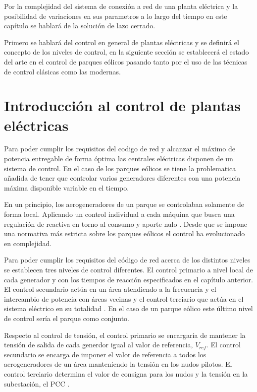 \documentclass{book}
\begin{document}
Por la complejidad del sistema de conexi\'on a red de una planta el\'ectrica y la posibilidad de variaciones en sus parametros a lo largo del tiempo en este cap\'itulo se hablar\'a de la soluci\'on de lazo cerrado. \par

 Primero se hablar\'a del control en general de plantas el\'ectricas y se definir\'a el concepto de los niveles de control, en la siguiente secci\'on se establecer\'a el estado del arte en el control de parques e\'olicos pasando tanto por el uso de las t\'ecnicas de control cl\'asicas como las modernas. \par 

	\section{Introducci\'on al control de plantas el\'ectricas}

Para poder cumplir los requisitos del codigo de red y alcanzar el m\'aximo de potencia entregable de forma \'optima las centrales el\'ectricas disponen de un sistema de control. En el caso de los parques e\'olicos se tiene la problematica añadida de tener que controlar varios generadores diferentes con una potencia m\'axima disponible variable en el tiempo. \par

En un principio, los aerogeneradores de un parque se controlaban solamente de forma local. Aplicando un control individual a cada m\'aquina que busca una regulaci\'on de reactiva en torno al consumo y aporte nulo \cite{PI_QV}. Desde que se impone una normativa m\'as estricta sobre los parques e\'olicos el control ha evolucionado en complejidad. \par

Para poder cumplir los requisitos del c\'odigo de red acerca de los distintos niveles se establecen tres niveles de control diferentes. El control primario a nivel local de cada generador y con los tiempos de reacci\'on especificados en el cap\'itulo anterior. El control secundario act\'ua en un \'area atendiendo a la frecuencia y el intercambio de potencia con \'areas vecinas y el control terciario que act\'ua en el sistema el\'ectrico en su totalidad \cite{NivelesDeControl}. En el caso de un parque e\'olico este \'ultimo nivel de control ser\'ia el parque como conjunto. \par

Respecto al control de tensi\'on, el control primario se encargar\'ia de mantener la tensi\'on de salida de cada generdor igual al valor de referencia, $V_{ref}$. El control secundario se encarga de imponer el valor de referencia a todos los aerogeneradores de un \'area manteniendo la tensi\'on en los nudos pilotos. El control terciario determina el valor de consigna para los nudos y la tensi\'on en la subestaci\'on, el PCC \cite{ControlCentrales}. \par
\end{document}
